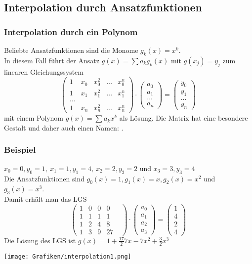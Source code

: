 \subsection{Interpolation durch Ansatzfunktionen}
\makeSectionDividerPage
%
%
\begin{frame}\frametitle{Interpolation durch ein Polynom}
Beliebte Ansatzfunktionen sind die Monome $g_k(x)=x^k$.\\
In diesem Fall führt der Ansatz $g(x)=\sum a_kg_k(x)$ mit $g(x_j)=y_j$ zum linearen Gleichungssystem
$$
\begin{pmatrix} 1 & x_0 & x_0^2& ... & x_0^n \\1 & x_1 & x_1^2& ... & x_1^n \\...\\1 & x_n & x_n^2& ... & x_n^n \end{pmatrix}\cdot \begin{pmatrix} a_0 \\ a_1 \\ ... \\ a_n \end{pmatrix} = \begin{pmatrix}y_0\\ y_1 \\ ... \\y_n \end{pmatrix}
$$
mit einem Polynom $g(x)=\sum a_kx^k$ als Lösung.\pause\vfill
Die Matrix hat eine besondere Gestalt und daher auch einen Namen: .
\end{frame}
%
\begin{frame}\frametitle{Beispiel}
$x_0=0, y_0=1, \ x_1=1, y_1=4,\ x_2=2, y_2=2 $ und $x_3=3, y_3=4$\\
Die Ansatzfunktionen sind
$g_0(x)=1, g_1(x)=x, g_2(x)=x^2$ und $g_3(x)=x^3$.\\
Damit erhält man das LGS
$$
\begin{pmatrix} 1 & 0 & 0& 0& \\ 1&1&1&1\\ 1 & 2 & 4 & 8\\ 1 & 3 & 9 &27 \end{pmatrix}\cdot \begin{pmatrix} a_0 \\ a_1 \\ a_2 \\ a_3 \end{pmatrix} = \begin{pmatrix}1\\4\\2\\4 \end{pmatrix}
$$\pause
Die Lösung des LGS ist $g(x)=1+\frac{17}{2}7x-7x^2+\frac{3}{2}x^3$
\begin{center}
\texttt{[image: Grafiken/interpolation1.png]}
\end{center}	
\end{frame}

